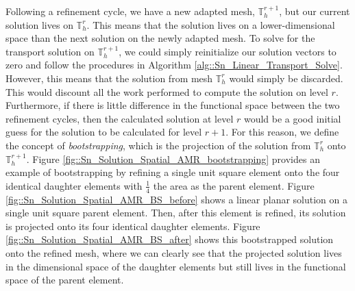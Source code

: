 Following a refinement cycle, we have a new adapted mesh, $\mathbb{T}_h^{r+1}$, but our current solution lives on $\mathbb{T}_h^{r}$. This means that the solution lives on a lower-dimensional space than the next solution on the newly adapted mesh. To solve for the transport solution on $\mathbb{T}_h^{r+1}$, we could simply reinitialize our solution vectors to zero and follow the procedures in Algorithm \ref{alg::Sn_Linear_Transport_Solve}. However, this means that the solution from mesh $\mathbb{T}_h^{r}$ would simply be discarded. This would discount all the work performed to compute the solution on level $r$. Furthermore, if there is little difference in the functional space between the two refinement cycles, then the calculated solution at level $r$ would be a good initial guess for the solution to be calculated for level $r+1$. For this reason, we define the concept of {\em bootstrapping}, which is the projection of the solution from $\mathbb{T}_h^{r}$ onto $\mathbb{T}_h^{r+1}$. Figure \ref{fig::Sn_Solution_Spatial_AMR_bootstrapping} provides an example of bootstrapping by refining a single unit square element onto the four identical daughter elements with $\frac{1}{4}$ the area as the parent element. Figure \ref{fig::Sn_Solution_Spatial_AMR_BS_before} shows a linear planar solution on a single unit square parent element. Then, after this element is refined, its solution is projected onto its four identical daughter elements. Figure \ref{fig::Sn_Solution_Spatial_AMR_BS_after} shows this bootstrapped solution onto the refined mesh, where we can clearly see that the projected solution lives in the dimensional space of the daughter elements but still lives in the functional space of the parent element.

